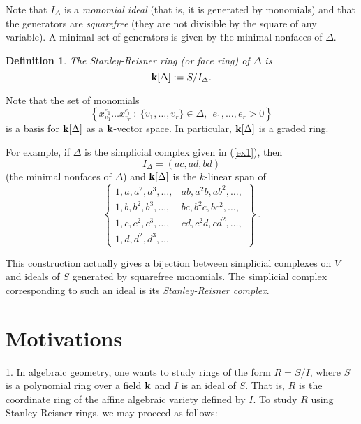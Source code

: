 \documentclass{amsart}
\newtheorem{defn}{Definition}
\newcommand{\fld}{{\bf k}}
\newcommand{\defterm}[1] {{\it #1\/}}
\begin{document}
Note that $I_\Delta$ is a \defterm{monomial ideal} (that is, it is generated by monomials) and
that the generators are \defterm{squarefree} (they are not divisible by the square of any
variable). A minimal set of generators is given by the minimal nonfaces of $\Delta$.

\begin{defn} The \defterm{Stanley-Reisner ring} (or \defterm{face ring}) of $\Delta$ is
	$$\fld[\Delta] := S/I_\Delta.$$
\end{defn}

Note that the set of monomials
	$$\left\{ x_{v_1}^{e_1} \dots x_{v_r}^{e_r} ~:~ \{v_1, \dots, v_r\} \in \Delta, ~~
	e_1, \dots, e_r > 0 \right\}$$
is a basis for $\fld[\Delta]$ as a $\fld$-vector space.  In particular, $\fld[\Delta]$ is a 
graded ring.

For example, if $\Delta$ is the simplicial complex given in (\ref{ex1}), then
	$$I_\Delta = (ac,ad,bd)$$
(the minimal nonfaces of $\Delta$) and $\fld[\Delta]$ is the $k$-linear span of
	\begin{equation} \label{bas}
	\left\{ \begin{array}{ll}
	1, a, a^2, a^3, \dots, & ab, a^2b, ab^2, \dots, \\
	1, b, b^2, b^3, \dots, & bc, b^2c, bc^2, \dots, \\
	1, c, c^2, c^3, \dots, & cd, c^2d, cd^2, \dots, \\
	1, d, d^2, d^3, \dots
	\end{array} \right\}~.
	\end{equation}

This construction actually gives a bijection between simplicial complexes on $V$ and ideals of
$S$ generated by squarefree monomials.  The simplicial complex corresponding to such an ideal
is its \defterm{Stanley-Reisner complex}.

\section{Motivations}

1. In algebraic geometry, one wants to study rings of the form $R=S/I$, where $S$ is a
polynomial ring over a field $\fld$ and $I$ is an ideal of $S$.  That is, $R$ is the
coordinate ring of the affine algebraic variety defined by $I$.  To study $R$ using
Stanley-Reisner rings, we may proceed as follows:
\end{document}
